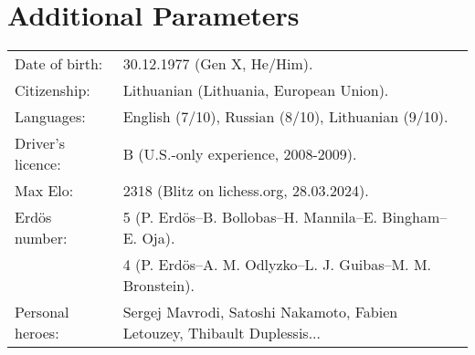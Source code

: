 \documentclass[a4paper,11pt]{article}
\begin{document}
\section{Additional Parameters}
%
\begin{tabular}{ll}
		Date of birth: & 30.12.1977 (Gen X, He/Him).\\
		Citizenship: & Lithuanian (Lithuania, European Union).\\
        Languages: & English (7/10), Russian (8/10), Lithuanian (9/10).\\
        Driver's licence:& B (U.S.-only experience, 2008-2009).\\
        Max Elo:& 2318 (Blitz on lichess.org, 28.03.2024).\\
        Erd\"{o}s number: & 5 (P. Erd\"{o}s--B. Bollobas--H. Mannila--E. Bingham--E. Oja).\\
                          & 4 (P. Erd\"{o}s--A. M. Odlyzko--L. J. Guibas--M. M. Bronstein).\\
    Personal heroes: & Sergej Mavrodi, Satoshi Nakamoto, Fabien Letouzey, Thibault Duplessis... 
\end{tabular}
%

\end{document}
